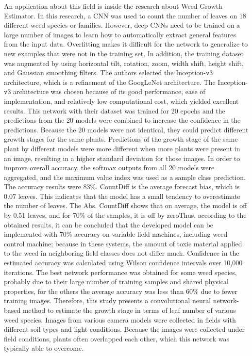 An application about this field is inside the research about Weed Growth Estimator\cite{s18051580}. In this research, a CNN was used to count the number of leaves on 18 different weed species or families. However, deep CNNs need to be trained on a large number of images
to learn how to automatically extract general features from the input data. Overfitting makes it difficult for the network to generalize to new examples that were not in
the training set. In addition, the training dataset was augmented by using horizontal tilt, rotation, zoom, width shift, height shift, and Gaussian smoothing filters. The
authors selected the Inception-v3\cite{szegedy2016rethinking} architecture, which is a refinement of the GoogLeNet\cite{szegedy2015going} architecture. The Inception-v3 architecture was chosen because of its good
performance, ease of implementation, and relatively low computational cost, which yielded excellent results. This network with their dataset was trained for 20 epochs
and the predictions from the 20 models were combined to increase the confidence in the predictions. Because the 20 models were not identical, they could predict different
growth stages for the same plants. Predictions of the growth stage of the same plant by different models were more different when more plants were present in an image,
resulting in a higher standard deviation for those images. In order to improve overall accuracy, the softmax outputs from all 20 models were aggregated, and the maximum
value index was used as a sample class prediction. The accuracy results were 83\%. CountDiff is the average forecast bias, which is 0.07 leaves. This indicates that the
model has a small tendency to overestimate the number of leaves. The Abs. CountDiff shows that on average, the model is off by 0.51 leaves, and for 70\% of the samples,
it is off by zeroThus, according to the obtained results, it can be concluded that the developed model can be implemented with 70\% accuracy on variable field machines,
including weed control machine; because in these systems, the amount of toxic material applied to the weed in neighboring field classes does not differ much. Confidence
in the estimated accuracy was calculated using Wilson confidence intervals over 10,000 iterations. The best network performance was obtained for some weed species, probably
due to their large number of training samples and shared physical properties, for the others the average accuracy was less than 60\% due to fewer training images. Therefore,
this study presents a convolutional neural network-based method to estimate the growth stage in terms of leaf number of various weed species. Images from various camera
models were collected in fields with different soil types and light conditions. Because the images were collected under field conditions, plants often overlapped each
other, which this network was typically able to overcome.

